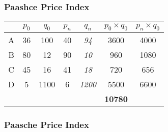 \documentclass{beamer}
\begin{document}
\begin{frame}
\frametitle{Paashce Price Index}
\begin{center}
\LARGE
\begin{tabular}{|c||c|c||c|c||c|c|}
\hline  &\phantom{s}$p_0$\phantom{s}	&	$q_0$	&	$p_n$	&	$q_n$	&	$p_0 \times q_0$	&	$p_n \times q_0$	\\	\hline
A & 36	&	100	&	40	&	\textit{94}	&	3600	&	4000	\\	\hline
B & 80	&	12	&	90	&	\textit{10}	&	960	&	1080	\\	\hline
C & 45	&	16	&	41	&	\textit{18}	&	720	&	656	\\	\hline
D & 5	&	1100	&	6	&	\textit{1200}	&	5500	&	6600	\\	\hline
& 	&		&		&		&	\textbf{10780}	& \phantom{12336}		\\	\hline
\end{tabular} 
\end{center}
\end{frame}

\begin{frame}
\frametitle{Paasche Price Index}

\end{frame}
\end{document}
